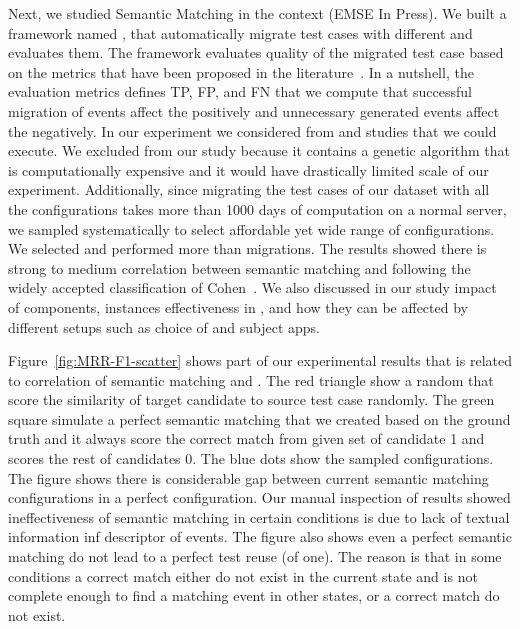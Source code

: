 \bigskip
Next, we studied Semantic Matching in the \testreuse context (EMSE In Press).
We built a framework named \tme, that automatically migrate test cases with different \smconfigs and evaluates them.
The framework evaluates quality of the migrated test case based on the metrics that have been proposed in the literature~\cite{zhao:fruiter:fse:2020}.
In a nutshell, the evaluation metrics defines TP, FP, and FN that we compute \fscore that successful migration of events affect the \fscore positively and unnecessary generated events affect the \fscore negatively.
In our experiment we considered \nexecapps from \atm and \craftdroid studies that we could execute.
We excluded \adaptdroid \selector from our study because it contains a genetic algorithm that is computationally expensive and it would have drastically limited scale of our experiment. 
Additionally, since migrating the test cases of our dataset with all the configurations takes more than 1000 days of computation on a normal server, we sampled \smconfigs systematically to select affordable yet wide range of configurations.
We selected \nsampledcomb and performed more than \nmigrations migrations.
\bigskip
The results showed there is strong to medium correlation between semantic matching and \testreuse following the widely accepted classification of Cohen~\cite{cohen:statisticalpower:Routledge:2013}.
We also discussed in our study impact of components, instances effectiveness in \testreuse, and how they can be affected by different setups such as choice of \selector and subject apps.

\bigskip
Figure~\ref{fig:MRR-F1-scatter} shows part of our experimental results that is related to correlation of semantic matching and \testreuse. 
The red triangle show a random \smconfig that score the similarity of target candidate to source test case randomly.
The green square simulate a perfect semantic matching that we created based on the ground truth and it always score the correct match from given set of candidate 1 and scores the rest of candidates 0. 
The blue dots show the sampled configurations.
The figure shows there is considerable gap between current semantic matching configurations in a perfect configuration. 
Our manual inspection of results showed ineffectiveness of semantic matching in certain conditions is due to lack of textual information inf descriptor of events.
The figure also shows even a perfect semantic matching do not lead to a perfect test reuse (\fscore of one).
The reason is that in some conditions a correct match either do not exist in the current state and \tam is not complete enough to find a matching event in other states, or a correct match do not exist. 





